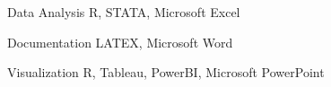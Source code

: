 


\begin{cvskills}
\cvskill
{Data Analysis} %
{R, STATA, Microsoft Excel} %


\cvskill
{Documentation} %
{LATEX, Microsoft Word} %

\cvskill
{Visualization} %
{R, Tableau, PowerBI, Microsoft PowerPoint} %
\end{cvskills}
\relax